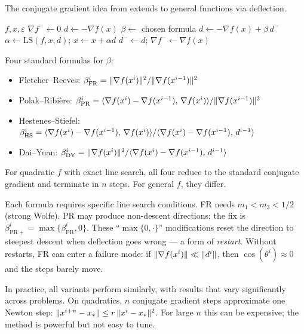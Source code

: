 The conjugate gradient idea from  extends to general functions via deflection.

\begin{algorithm}
	\caption{Nonlinear Conjugate Gradient (NCG)}
	\begin{algorithmic}[1]
		\Require $f, x, \varepsilon$
			\State $\nabla f^- \gets 0$
					\State $d \gets -\nabla f(x)$ 
				\Else
					\State $\beta \gets$ chosen formula
					\State $d \gets -\nabla f(x) + \beta\, d^-$
				\EndIf
				\State $\alpha \gets \mathrm{LS}(f, x, d)$;\; $x \gets x + \alpha d$
				\State $d^- \gets d$;\; $\nabla f^- \gets \nabla f(x)$
			\EndWhile
		\EndProcedure
	\end{algorithmic}
\end{algorithm}

Four standard formulas for $\beta$:
\begin{itemize}
	\item Fletcher--Reeves: $\beta_{\mathrm{FR}}^i = \lVert\nabla f(x^i)\rVert^2 / \lVert\nabla f(x^{i-1})\rVert^2$
	\item Polak--Ribi\`ere: $\beta_{\mathrm{PR}}^i = \langle\nabla f(x^i) - \nabla f(x^{i-1}),\, \nabla f(x^i)\rangle / \lVert\nabla f(x^{i-1})\rVert^2$
	\item Hestenes--Stiefel: $\beta_{\mathrm{HS}}^i = \langle\nabla f(x^i) - \nabla f(x^{i-1}),\, \nabla f(x^i)\rangle / \langle\nabla f(x^i) - \nabla f(x^{i-1}),\, d^{i-1}\rangle$
	\item Dai--Yuan: $\beta_{\mathrm{DY}}^i = \lVert\nabla f(x^i)\rVert^2 / \langle\nabla f(x^i) - \nabla f(x^{i-1}),\, d^{i-1}\rangle$
\end{itemize}
For quadratic $f$ with exact line search, all four reduce to the standard conjugate gradient and terminate in $n$ steps.
For general $f$, they differ.

Each formula requires specific line search conditions.
FR needs $m_1 < m_3 < 1/2$ (strong Wolfe).
PR may produce non-descent directions; the fix is $\beta_{\mathrm{PR}+}^i = \max\{\beta_{\mathrm{PR}}^i, 0\}$.
These ``$\max\{0, \cdot\}$'' modifications reset the direction to steepest descent when deflection goes wrong --- a form of \textit{restart}.
Without restarts, FR can enter a failure mode: if $\lVert\nabla f(x^i)\rVert \ll \lVert d^i\rVert$, then $\cos(\theta^i) \approx 0$ and the steps barely move.

In practice, all variants perform similarly, with results that vary significantly across problems.
On quadratics, $n$ conjugate gradient steps approximate one Newton step: $\lVert x^{i+n} - x_*\rVert \leq r\, \lVert x^i - x_*\rVert^2$.
For large $n$ this can be expensive; the method is powerful but not easy to tune.


